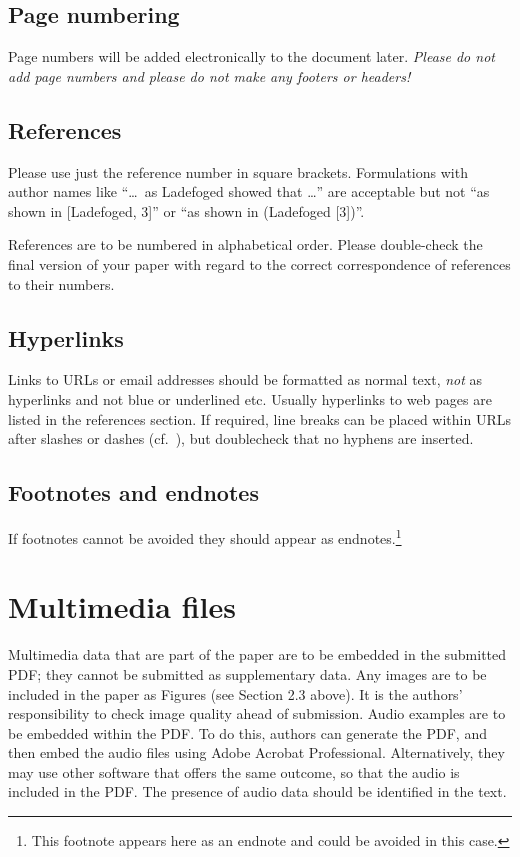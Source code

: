 \documentclass[
  a4paper,
  11pt,
  twocolumn]{article}
\begin{document}
\subsection{Page numbering}

Page numbers will be added electronically to the document later.
\textit{Please do not add page numbers and please do not make any footers or 
headers!}

\subsection{References}

Please use just the reference number in square brackets. Formulations
with author names like ``\ldots~as Ladefoged \cite{Ladefoged:2003}
showed that \ldots'' are acceptable but not ``as shown in {[}Ladefoged,
3{]}'' or ``as shown in (Ladefoged {[}3{]})''.

References are to be numbered in alphabetical order. Please double-check
the final version of your paper with regard to the correct
correspondence of references to their numbers.

\subsection{Hyperlinks}

Links to URLs or email addresses should be formatted as normal text,
\textit{not} as hyperlinks and not blue or underlined etc. Usually
hyperlinks to web pages are listed in the references section. If
required, line breaks can be placed within URLs after slashes or dashes
(cf.~\cite{IPA-SIL, IPA-KEYBOARD}), but doublecheck that no hyphens are
inserted.

\subsection{Footnotes and endnotes}

If footnotes cannot be avoided they should appear as
endnotes.\footnote{This 
footnote appears here as an endnote and could be avoided in this case.}

\section{Multimedia files}

Multimedia data that are part of the paper are to be embedded in the
submitted PDF; they cannot be submitted as supplementary data. Any
images are to be included in the paper as Figures (see Section 2.3
above). It is the authors' responsibility to check image quality ahead
of submission. Audio examples are to be embedded within the PDF. To do
this, authors can generate the PDF, and then embed the audio files using
Adobe Acrobat Professional. Alternatively, they may use other software
that offers the same outcome, so that the audio is included in the PDF.
The presence of audio data should be identified in the text.
\end{document}
